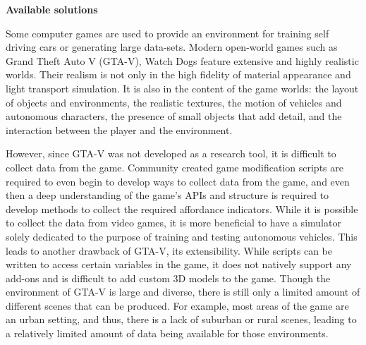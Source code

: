 \documentclass{VUMIFPS-master-intro}
\begin{document}


\textbf{Available solutions}

Some computer games are used to provide an environment for training self driving cars or generating large data-sets. Modern open-world games such as Grand Theft Auto V (GTA-V), Watch Dogs feature extensive and highly realistic worlds. Their realism is not only in the high fidelity of material appearance and light transport simulation. It is also in the content of the game worlds: the layout of objects and environments, the realistic textures, the motion of vehicles and autonomous characters, the presence of small objects that add detail, and the interaction between the player and the environment. \cite{Richter2016}

However, since GTA-V was not developed as a research tool, it is difficult to collect data from the
game. Community created game modification scripts are required to even begin to develop ways to collect data from the game, and even then a deep understanding of the game’s APIs and structure is required to develop methods to collect the required affordance indicators. While it is possible to collect the data from video games, it is more beneficial to have a simulator solely dedicated to the purpose of training and testing autonomous vehicles. This leads to another drawback of GTA-V, its extensibility. While scripts can be written to access certain
variables in the game, it does not natively support any add-ons and is difficult to add custom 3D models to the game. Though the environment of GTA-V is large and diverse, there is still only a limited amount of different scenes that can be produced. For example, most areas of the game are an urban setting, and thus, there is a lack of suburban or rural scenes, leading to a relatively limited amount of data being available for those environments. \cite{Martinez2017}
\end{document}
